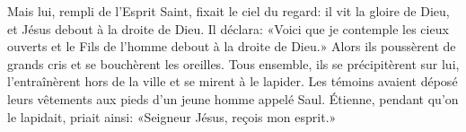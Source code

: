 Mais lui, rempli de l’Esprit Saint, fixait le ciel du regard:
	il vit la gloire de Dieu, et Jésus debout à la droite de Dieu.
Il déclara: «Voici que je contemple les cieux ouverts
	et le Fils de l’homme debout à la droite de Dieu.»
Alors ils poussèrent de grands cris et se bouchèrent les oreilles.
Tous ensemble, ils se précipitèrent sur lui,
	l’entraînèrent hors de la ville et se mirent à le lapider.
Les témoins avaient déposé leurs vêtements
		aux pieds d’un jeune homme appelé Saul.
Étienne, pendant qu’on le lapidait, priait ainsi:
	«Seigneur Jésus, reçois mon esprit.»
